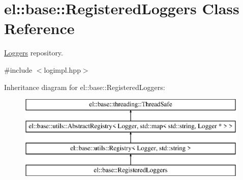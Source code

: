 \hypertarget{classel_1_1base_1_1RegisteredLoggers}{\section{el\-:\-:base\-:\-:Registered\-Loggers Class Reference}
\label{classel_1_1base_1_1RegisteredLoggers}
}


\hyperlink{classel_1_1Loggers}{Loggers} repository.  




{\ttfamily \#include $<$logimpl.\-hpp$>$}

Inheritance diagram for el\-:\-:base\-:\-:Registered\-Loggers\-:\begin{figure}[H]
\begin{center}
\leavevmode
\includegraphics[height=4.000000cm]{classel_1_1base_1_1RegisteredLoggers}
\end{center}
\end{figure}
